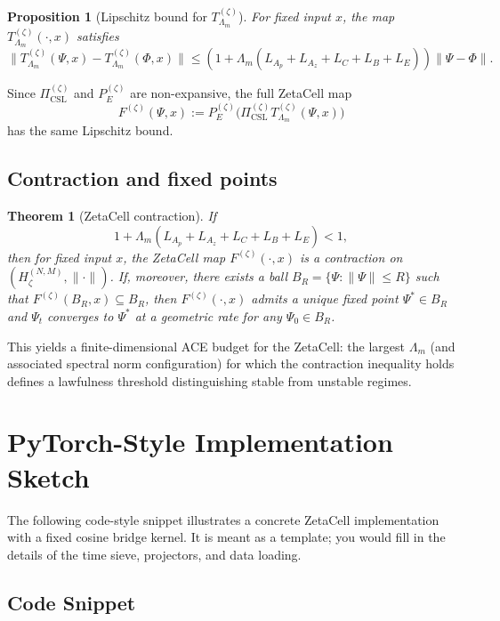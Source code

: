 \documentclass[11pt]{article}
\theoremstyle{definition}
\theoremstyle{plain}
\newtheorem{theorem}{Theorem}
\newtheorem{proposition}{Proposition}
\begin{document}
\begin{proposition}[Lipschitz bound for $T_{\Lambda_m}^{(\zeta)}$]
For fixed input $x$, the map $T_{\Lambda_m}^{(\zeta)}(\cdot,x)$ satisfies
\[
  \|T_{\Lambda_m}^{(\zeta)}(\Psi,x) - T_{\Lambda_m}^{(\zeta)}(\Phi,x)\|
  \le \left(1 + \Lambda_m(L_{A_p}+L_{A_z}+L_C+L_B+L_E)\right)\|\Psi - \Phi\|.
\]
\end{proposition}

Since $\Pi_{\mathrm{CSL}}^{(\zeta)}$ and $P_E^{(\zeta)}$ are non-expansive, the full ZetaCell map
\[
  F^{(\zeta)}(\Psi,x) := P_E^{(\zeta)}\bigl(\Pi_{\mathrm{CSL}}^{(\zeta)}T_{\Lambda_m}^{(\zeta)}(\Psi,x)\bigr)
\]
has the same Lipschitz bound.

\subsection{Contraction and fixed points}

\begin{theorem}[ZetaCell contraction]\label{thm:zetacontract}
If
\[
  1 + \Lambda_m(L_{A_p}+L_{A_z}+L_C+L_B+L_E) < 1,
\]
then for fixed input $x$, the ZetaCell map $F^{(\zeta)}(\cdot,x)$ is a contraction on $(H_\zeta^{(N,M)},\|\cdot\|)$.
If, moreover, there exists a ball $B_R = \{\Psi : \|\Psi\|\le R\}$ such that $F^{(\zeta)}(B_R,x)\subseteq B_R$, then $F^{(\zeta)}(\cdot,x)$ admits a unique fixed point $\Psi^\ast\in B_R$ and $\Psi_t$ converges to $\Psi^\ast$ at a geometric rate for any $\Psi_0\in B_R$.
\end{theorem}

This yields a finite-dimensional ACE budget for the ZetaCell: the largest $\Lambda_m$ (and associated spectral norm configuration) for which the contraction inequality holds defines a lawfulness threshold distinguishing stable from unstable regimes.

\section{PyTorch-Style Implementation Sketch}

The following code-style snippet illustrates a concrete ZetaCell implementation with a fixed cosine bridge kernel.
It is meant as a template; you would fill in the details of the time sieve, projectors, and data loading.

\subsection*{Code Snippet}
\end{document}
